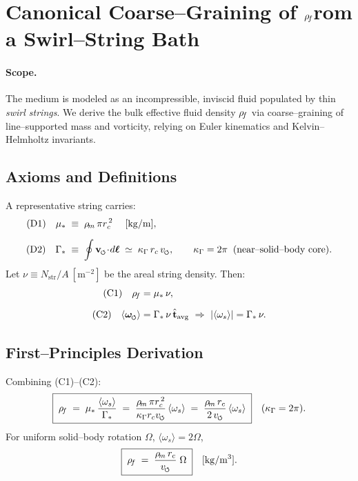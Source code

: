 \documentclass[11pt]{article}
\begin{document}
    \section{Canonical Coarse–Graining of \texorpdfstring{$\rho_{\!f}$} from a Swirl–String Bath}
    \label{sec:canon_rhof_from_strings}

    \paragraph{Scope.}
    The medium is modeled as an incompressible, inviscid fluid populated by thin \emph{swirl strings}. We derive the bulk effective fluid density \(\rho_{\!f}\) via coarse–graining of line–supported mass and vorticity, relying on Euler kinematics and Kelvin–Helmholtz invariants.

    \subsection{Axioms and Definitions}
    A representative string carries:
    \begin{align}
        \text{(D1)}\quad
        \mu_\ast &\;\equiv\; \rhom\,\pi \rc^{\,2}
        \quad\;[\mathrm{kg/m}], \\[2mm]
        \text{(D2)}\quad
        \Gamma_\ast &\;\equiv\; \oint \vswirl\!\cdot\! d\boldsymbol{\ell}
        \;\simeq\; \kappa_\Gamma\, \rc\, \vscore,
        \qquad \kappa_\Gamma=2\pi \;\; \text{(near–solid–body core)}.
    \end{align}
    Let
    \(
    \nu \equiv N_{\text{str}}/A \ [\mathrm{m^{-2}}]
    \)
    be the areal string density. Then:
    \begin{align}
        \text{(C1)}\quad
        \rhof &= \mu_\ast\,\nu, \\[2mm]
        \text{(C2)}\quad
        \langle \omegas\rangle &= \Gamma_\ast\,\nu\,\hat{\mathbf{t}}_{\text{avg}}
        \ \Rightarrow\  |\langle\omega_s\rangle|=\Gamma_\ast\,\nu.
    \end{align}

    \subsection{First–Principles Derivation}
    Combining (C1)–(C2):
    \begin{equation}
        \boxed{\;
        \rhof
        \;=\; \mu_\ast\,\frac{\langle\omega_s\rangle}{\Gamma_\ast}
        \;=\; \frac{\rhom\,\pi \rc^{\,2}}{\kappa_\Gamma \rc \vscore}\,\langle\omega_s\rangle
        \;=\; \frac{\rhom\,\rc}{2\,\vscore}\,\langle\omega_s\rangle
        \;}
        \quad (\kappa_\Gamma=2\pi).
        \label{eq:rhof_from_omega}
    \end{equation}
    For uniform solid–body rotation \(\Omega\), \(\langle\omega_s\rangle=2\Omega\),
    \begin{equation}
        \boxed{\;
        \rhof
        \;=\; \frac{\rhom\,\rc}{\vscore}\;\Omega
        \;}
        \quad [\mathrm{kg/m^3}].
        \label{eq:rhof_from_Omega}
    \end{equation}
\end{document}
